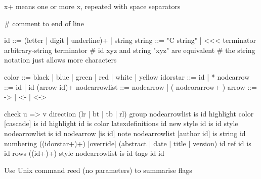 x+ means one or more x, repeated with space separators

# comment to end of line

id ::= (letter | digit | underline)+ | string
string ::= "C string" | <<< terminator \n arbitrary-string \n terminator
# id xyz and string "xyz" are equivalent
# the string notation just allows more characters

color ::= black | blue | green | red | white | yellow
idorstar ::= id | *
nodearrow ::= id | id (arrow id)+
nodearrowlist ::= nodearrow | ( nodeorarrow+ )
arrow ::= -> | <- | <->

check u => v
direction (lr | bt | tb | rl)
group nodearrowlist is id
highlight color [cascade] is id
highlight id is color
latexdefinitions id
new style id is id
style nodearrowlist is id
nodearrow [is id]
note nodearrowlist [author id] is string id
numbering ((idorstar+)+)
[override] (abstract | date | title | version) id
ref id is id
rows ((id+)+)
style nodearrowlist is id
tags id id

Use Unix command reed (no parameters) to summarise flags











